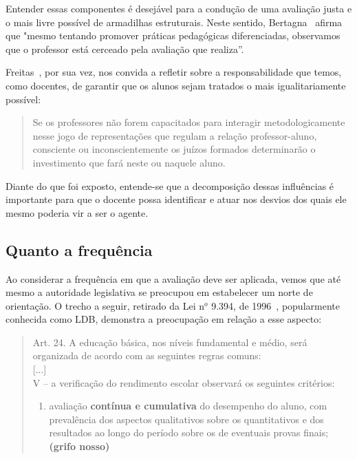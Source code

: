 Entender essas componentes é desejável para a condução de uma avaliação justa e o mais livre possível de armadilhas estruturais. Neste sentido, Bertagna~\cite{bertagna2006} afirma que "mesmo tentando promover práticas pedagógicas diferenciadas, observamos que o professor está cerceado pela avaliação que realiza''.

Freitas~\cite{de2003ciclos}, por sua vez, nos convida a refletir sobre a responsabilidade que temos, como docentes, de garantir que os alunos sejam tratados o mais igualitariamente possível:

\begin{quote}
Se os professores não forem capacitados para interagir metodologicamente nesse jogo de representações que regulam a relação professor-aluno, consciente ou inconscientemente os juízos formados determinarão o investimento que fará neste ou naquele aluno.~\cite{de2003ciclos}
\end{quote}%

Diante do que foi exposto, entende-se que a decomposição dessas influências é importante para que o docente possa identificar e atuar nos desvios dos quais ele mesmo poderia vir a ser o agente. 

\subsection{Quanto a frequência}%
Ao considerar a frequência em que a avaliação deve ser aplicada, vemos que até mesmo a autoridade legislativa se preocupou em estabelecer um norte de orientação. O trecho a seguir, retirado da Lei n{$^o$} 9.394, de 1996~\cite{brasilLDB}, popularmente conhecida como \acrfull{LDB},  demonstra a preocupação em relação a esse aspecto:


\begin{quote}
Art. 24. A educação básica, nos níveis fundamental e médio, será organizada de acordo com as seguintes regras comuns: \\
{[...]} \\
V – a verificação do rendimento escolar observará os seguintes critérios:
\renewcommand{\labelenumi}{\alph{enumi})}
\begin{enumerate}
\item avaliação \textbf{contínua e cumulativa} do desempenho do aluno, com prevalência dos aspectos qualitativos sobre os quantitativos e dos resultados ao longo do período sobre os de eventuais provas finais; \textbf{(grifo nosso)}~\cite{brasilLDB}
\end{enumerate}
\end{quote}%


